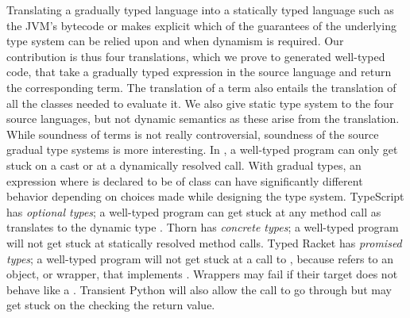 \documentclass[acmlarge, anonymous, authordraft, review]{acmart} %
\begin{document}
Translating a gradually typed language into a statically typed language such
as the JVM's bytecode or \kafka makes explicit which of the guarantees of
the underlying type system can be relied upon and when dynamism is required.
Our contribution is thus four translations, which we prove to generated
well-typed code, that take a gradually typed expression \HT\e\T in the
source language and return the corresponding \kafka term. The translation of
a term also entails the translation of all the classes needed to evaluate
it. We also give static type system to the four source languages, but not
dynamic semantics as these arise from the translation.  While soundness of
\kafka terms is not really controversial, soundness of the source gradual
type systems is more interesting.  In \kafka, a well-typed program can only
get stuck on a cast or at a dynamically resolved call.  With gradual types,
an expression \Call\x\m\e where \x is declared to be of class \C can have
significantly different behavior depending on choices made while designing
the type system. TypeScript has \emph{optional types}; a well-typed
program can get stuck at any method call as \C translates to the dynamic
type \any. Thorn has \emph{concrete types}; a well-typed program will not
get stuck at statically resolved method calls. Typed Racket has
\emph{promised types}; a well-typed program will not get stuck at a call to
\m, because \x refers to an object, or wrapper, that implements \m.
Wrappers may fail if their target does not behave like a \C. Transient
Python will also allow the call to go through but may get stuck on the
checking the return value.
\end{document}
